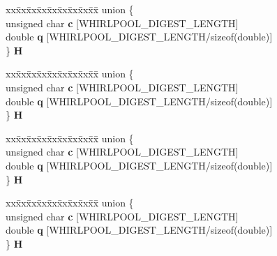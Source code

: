 \begin{DoxyCompactItemize}
\begin{tabbing}
\end{tabbing}\item 
\mbox{\label{structWHIRLPOOL__CTX_a0c8a51b76eb5288fbce5252f615ad8cd}} 
\begin{tabbing}
xx\=xx\=xx\=xx\=xx\=xx\=xx\=xx\=xx\=\kill
union \{\\
\>unsigned char {\bfseries c} \mbox{[}WHIRLPOOL\_DIGEST\_LENGTH\mbox{]}\\
\>double {\bfseries q} \mbox{[}WHIRLPOOL\_DIGEST\_LENGTH/sizeof(double)\mbox{]}\\
\} {\bfseries H}\\

\end{tabbing}\item 
\mbox{\label{structWHIRLPOOL__CTX_a30b670048f83ab448310f874c88b513d}} 
\begin{tabbing}
xx\=xx\=xx\=xx\=xx\=xx\=xx\=xx\=xx\=\kill
union \{\\
\>unsigned char {\bfseries c} \mbox{[}WHIRLPOOL\_DIGEST\_LENGTH\mbox{]}\\
\>double {\bfseries q} \mbox{[}WHIRLPOOL\_DIGEST\_LENGTH/sizeof(double)\mbox{]}\\
\} {\bfseries H}\\

\end{tabbing}\item 
\mbox{\label{structWHIRLPOOL__CTX_a7aa5912ccc02a3d4e5664e715d0fa757}} 
\begin{tabbing}
xx\=xx\=xx\=xx\=xx\=xx\=xx\=xx\=xx\=\kill
union \{\\
\>unsigned char {\bfseries c} \mbox{[}WHIRLPOOL\_DIGEST\_LENGTH\mbox{]}\\
\>double {\bfseries q} \mbox{[}WHIRLPOOL\_DIGEST\_LENGTH/sizeof(double)\mbox{]}\\
\} {\bfseries H}\\

\end{tabbing}\item 
\mbox{\label{structWHIRLPOOL__CTX_acd2058ed180b3bdfff0bc1624264acb9}} 
\begin{tabbing}
xx\=xx\=xx\=xx\=xx\=xx\=xx\=xx\=xx\=\kill
union \{\\
\>unsigned char {\bfseries c} \mbox{[}WHIRLPOOL\_DIGEST\_LENGTH\mbox{]}\\
\>double {\bfseries q} \mbox{[}WHIRLPOOL\_DIGEST\_LENGTH/sizeof(double)\mbox{]}\\
\} {\bfseries H}\\


\end{tabbing}
\end{DoxyCompactItemize}
